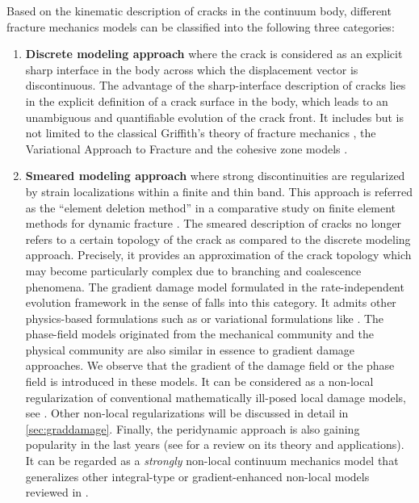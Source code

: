 Based on the kinematic description of cracks in the continuum body, different fracture mechanics models can be classified into the following three categories:
\begin{enumerate}
\item \textbf{Discrete modeling approach} where the crack is considered as an explicit sharp interface in the body across which the displacement vector is discontinuous. The advantage of the sharp-interface description of cracks lies in the explicit definition of a crack surface in the body, which leads to an unambiguous and quantifiable evolution of the crack front. It includes but is not limited to the classical Griffith's theory of fracture mechanics \cite{Freund:1990}, the Variational Approach to Fracture \cite{FrancfortMarigo:1998,BourdinFrancfortMarigo:2008,Larsen:2010} and the cohesive zone models \cite{Barenblatt:1962}.

\item \textbf{Smeared modeling approach} where strong discontinuities are regularized by strain localizations within a finite and thin band. This approach is referred as the ``element deletion method'' in a comparative study on finite element methods for dynamic fracture \cite{SongWangBelytschko:2008}. The smeared description of cracks no longer refers to a certain topology of the crack as compared to the discrete modeling approach. Precisely, it provides an approximation of the crack topology which may become particularly complex due to branching and coalescence phenomena. The gradient damage model \cite{PhamMarigo:2010-1,PhamAmorMarigoMaurini:2011} formulated in the rate-independent evolution framework in the sense of \cite{Mielke:2005} falls into this category. It admits other physics-based formulations such as \cite{Comi:1999} or variational formulations like \cite{LorentzAndrieux:1999}. The phase-field models originated from the mechanical community \cite{HofackerMiehe:2012,MieheWelschingerHofacker:2010,BordenVerhooselScottHughesLandis:2012} and the physical community \cite{HakimKarma:2009,KarmaKesslerLevine:2001} are also similar in essence to gradient damage approaches. We observe that the gradient of the damage field or the phase field is introduced in these models. It can be considered as a non-local regularization of conventional mathematically ill-posed local damage models, see \cite{LorentzAndrieux:2003}. Other non-local regularizations will be discussed in detail in \cref{sec:graddamage}. Finally, the peridynamic approach is also gaining popularity in the last years (see \cite{Silling:2010aa} for a review on its theory and applications). It can be regarded as a \emph{strongly} non-local continuum mechanics model that generalizes other integral-type or gradient-enhanced non-local models reviewed in \cite{LorentzAndrieux:2003}.


\end{enumerate}
